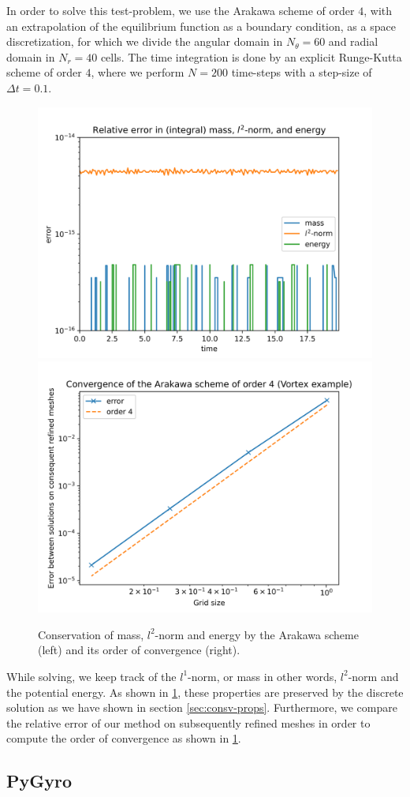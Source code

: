 In order to solve this test-problem, we use the Arakawa scheme of order $4$, with an extrapolation of the equilibrium function as a boundary condition, as a space discretization, for which we divide the angular domain in $N_\theta = 60$ and radial domain in $N_r = 40$ cells. The time integration is done by an explicit Runge-Kutta scheme of order $4$, where we perform $N = 200$ time-steps with a step-size of $\Delta t = 0.1$.
\begin{figure}[h]
	\centering
	\includegraphics[width=0.45\linewidth]{plots/vortex_cons.png}
	\includegraphics[width=0.45\linewidth]{plots/vortex_conv.png}
	\caption{Conservation of mass, $l^2$-norm and energy by the Arakawa scheme (left) and its order of convergence (right).}
	\label{fig:vortex_con}
\end{figure}
While solving, we keep track of the $l^1$-norm, or mass in other words, $l^2$-norm and the potential energy. As shown in \ref{fig:vortex_con}, these properties are preserved by the discrete solution as we have shown in section \ref{sec:consv-props}. Furthermore, we compare the relative error of our method on subsequently refined meshes in order to compute the order of convergence as shown in \ref{fig:vortex_con}.





\subsection{PyGyro}

